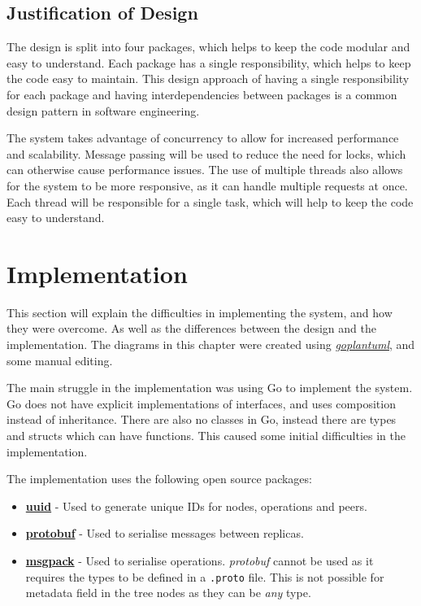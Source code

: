 \documentclass[12pt]{report}
\begin{document}
\section{Justification of Design}
The design is split into four packages, which helps to keep the code modular and easy to understand. Each package has a single responsibility, which helps to keep the code easy to maintain. This design approach of having a single responsibility for each package and having interdependencies between packages is a common design pattern in software engineering. \par

The system takes advantage of concurrency to allow for increased performance and scalability. Message passing will be used to reduce the need for locks, which can otherwise cause performance issues. The use of multiple threads also allows for the system to be more responsive, as it can handle multiple requests at once. Each thread will be responsible for a single task, which will help to keep the code easy to understand. \par


\chapter{Implementation}\label{sec:implementation}
This section will explain the difficulties in implementing the system, and how they were overcome. As well as the differences between the design and the implementation. The diagrams in this chapter were created using \href{https://github.com/jfeliu007/goplantuml}{\color{blue}\textit{goplantuml}}, and some manual editing.  \par
The main struggle in the implementation was using Go to implement the system. Go does not have explicit implementations of interfaces, and uses composition instead of inheritance. There are also no classes in Go, instead there are types and structs which can have functions. This caused some initial difficulties in the implementation. \par

The implementation uses the following open source packages:
\begin{itemize}
    \item \textbf{\href{https://pkg.go.dev/github.com/google/uuid@v1.3.0}{uuid}} - Used to generate unique IDs for nodes, operations and peers.
    \item \textbf{\href{https://pkg.go.dev/google.golang.org/protobuf}{protobuf}} - Used to serialise messages between replicas.
    \item \textbf{\href{https://pkg.go.dev/github.com/vmihailenco/msgpack@v4.0.4+incompatible}{msgpack}} - Used to serialise operations. \textit{protobuf} cannot be used as it requires the types to be defined in a \texttt{.proto} file. This is not possible for metadata field in the tree nodes as they can be \textit{any} type.
\end{itemize}
\end{document}
